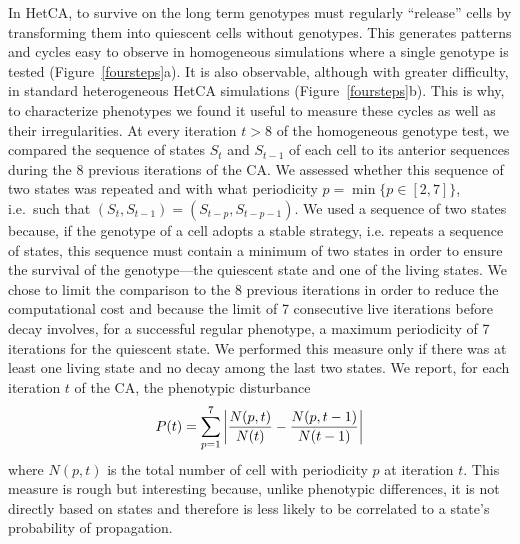 In HetCA, to survive on the long term genotypes must regularly ``release'' cells by transforming them into quiescent cells without genotypes. This generates patterns and cycles easy to observe in homogeneous simulations where a single genotype is tested (Figure~\ref{foursteps}a). It is also observable, although with greater difficulty, in standard heterogeneous HetCA simulations (Figure~\ref{foursteps}b). This is why, to characterize phenotypes we found it useful to measure these cycles as well as their irregularities. At every iteration $t > 8$ of the homogeneous genotype test, we compared the sequence of states $S_t$ and $S_{t-1}$ of each cell to its anterior sequences during the 8 previous iterations of the CA. We assessed whether this sequence of two states was repeated and with what periodicity $p=\min\{p \in [2,7]\}$, i.e.~such that $(S_t,S_{t-1}) = (S_{t-p},S_{t-p-1})$. We used a sequence of two states because, if the genotype of a cell adopts a stable strategy, i.e. repeats a sequence of states, this sequence must contain a minimum of two states in order to ensure the survival of the genotype---the quiescent state and one of the living states. We chose to limit the comparison to the 8 previous iterations in order to reduce the computational cost and because the limit of 7 consecutive live iterations before decay involves, for a successful regular phenotype, a maximum periodicity of 7 iterations for the quiescent state. We performed this measure only if there was at least one living state and no decay among the last two states. We report, for each iteration $t$ of the CA, the phenotypic disturbance
%
$$P(t) = \sum_{p=1}^7 \left| \frac{N(p,t)}{N(t)}-\frac{N(p,t-1)}{N(t-1)}\right|$$
%
where $N(p,t)$ is the total number of cell with periodicity $p$ at iteration $t$. This measure is rough but interesting because, unlike phenotypic differences, it is not directly based on states and therefore is less likely to be correlated to a state’s probability of propagation.
 
